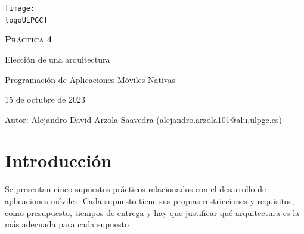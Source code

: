 \documentclass[a4paper]{article}
\newcommand{\dateToday}{15 de octubre de 2023}
\newcommand{\logoULPGC}{imagenes/ulpgc.png}
\newcommand{\portada}{imagenes/arquitectura.PNG}
\begin{document}
    \begin{titlepage}
        \centering
        \vspace*{2cm}

        \texttt{[image: \\logoULPGC]}\par\vspace{1cm}
    
        {\scshape\textbf{\LARGE Práctica 4}}\par
        \vspace{0.6cm}
        {\bfseries}{\Huge Elección de una arquitectura}
        \vspace{1cm}


            \centering
            \vspace{1cm}

        
        \begin{tcolorbox}[colback=red!5!white,colframe=white!50!black]
            \centering \Large Programación de Aplicaciones Móviles Nativas \par
            \dateToday
        \end{tcolorbox}

        \vspace{1cm}        
        \begin{tcolorbox}[colback=blue!5!white,colframe=blue!75!black]
            Autor:
            \tcblower
            Alejandro David Arzola Saavedra (alejandro.arzola101@alu.ulpgc.es)
        \end{tcolorbox}
    \end{titlepage}
    
    \newpage
        
    \tableofcontents 
    
    \newpage

    \section{Introducción}

    Se presentan cinco supuestos prácticos relacionados con el desarrollo de aplicaciones móviles. Cada supuesto tiene sus propias restricciones y requisitos, como presupuesto, tiempos de entrega y hay que  justificar qué arquitectura es la más adecuada para cada supuesto
    
\end{document}
